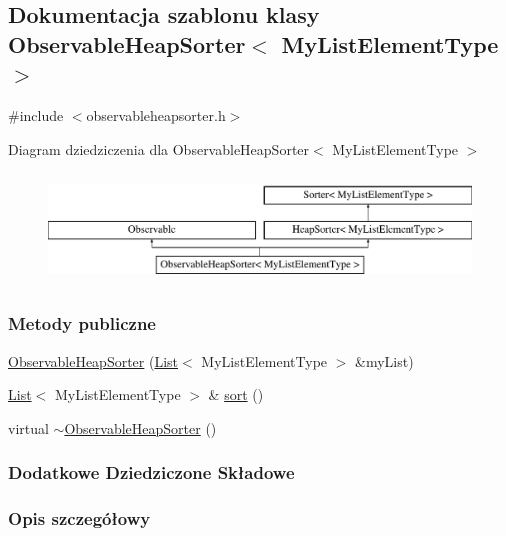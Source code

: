 \hypertarget{class_observable_heap_sorter}{\subsection{Dokumentacja szablonu klasy Observable\-Heap\-Sorter$<$ My\-List\-Element\-Type $>$}
\label{class_observable_heap_sorter}
}


{\ttfamily \#include $<$observableheapsorter.\-h$>$}

Diagram dziedziczenia dla Observable\-Heap\-Sorter$<$ My\-List\-Element\-Type $>$\begin{figure}[H]
\begin{center}
\leavevmode
\includegraphics[height=2.957747cm]{class_observable_heap_sorter}
\end{center}
\end{figure}
\subsubsection*{Metody publiczne}
\begin{DoxyCompactItemize}
\item 
\hyperlink{class_observable_heap_sorter_a3102c57c74f30fb5b5be17f2d2c5bd68}{Observable\-Heap\-Sorter} (\hyperlink{class_list}{List}$<$ My\-List\-Element\-Type $>$ \&my\-List)
\item 
\hyperlink{class_list}{List}$<$ My\-List\-Element\-Type $>$ \& \hyperlink{class_observable_heap_sorter_a5e92d70e5a769ba7249f974a48b94bd0}{sort} ()
\item 
virtual \hyperlink{class_observable_heap_sorter_a46e45f721463f961065eb0e78ab17e12}{$\sim$\-Observable\-Heap\-Sorter} ()
\end{DoxyCompactItemize}
\subsubsection*{Dodatkowe Dziedziczone Składowe}


\subsubsection{Opis szczegółowy}
